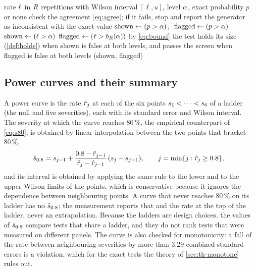 \begin{algorithm}[htbp]
\caption{Judging the size of one test at one level $\lev$ from its null cell: the definition of holding a size and the screen.}
\label{alg:judgement}
\begin{algorithmic}[1]
\Require rate $\hat{r}$ in $R$ repetitions with Wilson interval $[\ell,u]$, level $\lev$, exact probability $p$ or none
  \State check the agreement \eqref{eq:agree}; if it fails, stop and report the generator as inconsistent with the exact value
  \State $\text{shown}\gets(p>\alpha)$; $\ \text{flagged}\gets(p>\alpha)$
\Else
  \State $\text{shown}\gets(\ell>\alpha)$ 
  \State $\text{flagged}\gets(\hat{r}>b_R(\alpha))$ by \eqref{eq:bound} 
\EndIf
\State the test holds its size (\cref{def:holds}) when shown is false at both levels, and passes the screen when flagged is false at both levels
\State \Return (shown, flagged)
\end{algorithmic}
\end{algorithm}

\subsection{Power curves and their summary}
\label{sec:pm-power}

A power curve is the rate $\hat{r}_j$ at each of the six points $s_1<\dots<s_6$ of a ladder (the null and five severities), each with its standard error and Wilson interval.
The severity at which the curve reaches 80\,\%, the empirical counterpart of \eqref{eq:s80}, is obtained by linear interpolation between the two points that bracket 80\,\%,
\begin{equation}
\hat{s}_{0.8}=s_{j-1}+\frac{0.8-\hat{r}_{j-1}}{\hat{r}_j-\hat{r}_{j-1}}\,(s_j-s_{j-1}),\qquad j=\min\{j:\hat{r}_j\ge0.8\},
\label{eq:s80-hat}
\end{equation}
and its interval is obtained by applying the same rule to the lower and to the upper Wilson limits of the points, which is conservative because it ignores the dependence between neighbouring points.
A curve that never reaches 80\,\% on its ladder has no $\hat{s}_{0.8}$; the measurement reports that and the rate at the top of the ladder, never an extrapolation.
Because the ladders are design choices, the values of $\hat{s}_{0.8}$ compare tests that share a ladder, and they do not rank tests that were measured on different panels.
The curve is also checked for monotonicity: a fall of the rate between neighbouring severities by more than 3.29 combined standard errors is a violation, which for the exact tests the theory of \cref{sec:th-monotone} rules out.

